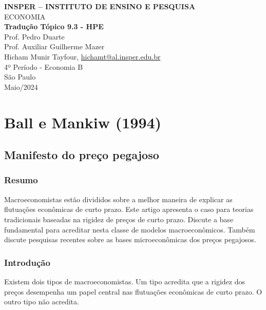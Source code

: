 \documentclass[a4paper,12pt]{article}[abntex2]
\begin{document}
\begin{titlepage}
    \centering
    \vspace*{1cm}
    \Large\textbf{INSPER – INSTITUTO DE ENSINO E PESQUISA}\\
    \Large ECONOMIA\\
    \vspace{1.5cm}
    \Large\textbf{Tradução Tópico 9.3 - HPE}\\
    \vspace{1.5cm}
    Prof. Pedro Duarte\\
    Prof. Auxiliar Guilherme Mazer\\
    \vfill
    \normalsize
    Hicham Munir Tayfour, \href{mailto:hichamt@al.insper.edu.br}{hichamt@al.insper.edu.br}\\
    4º Período - Economia B\\
    \vfill
    São Paulo\\
    Maio/2024
\end{titlepage}

\newpage
\tableofcontents
\thispagestyle{empty} %
\newpage
\setcounter{page}{1} %
\justify
\onehalfspacing

\pagestyle{fancy}
\fancyhf{}
\rhead{\thepage}

\section{\textbf{Ball e Mankiw (1994)}}
\subsection{\textbf{Manifesto do preço pegajoso}}
\subsubsection{\textbf{Resumo}}

Macroeconomistas estão divididos sobre a melhor maneira de explicar as flutuações econômicas de curto prazo. Este artigo apresenta o caso para teorias tradicionais baseadas na rigidez de preços de curto prazo. Discute a base fundamental para acreditar nesta classe de modelos macroeconômicos. Também discute pesquisas recentes sobre as bases microeconômicas dos preços pegajosos.

\subsubsection{\textbf{Introdução}}
Existem dois tipos de macroeconomistas. Um tipo acredita que a rigidez dos preços desempenha um papel central nas flutuações econômicas de curto prazo. O outro tipo não acredita.
\end{document}
